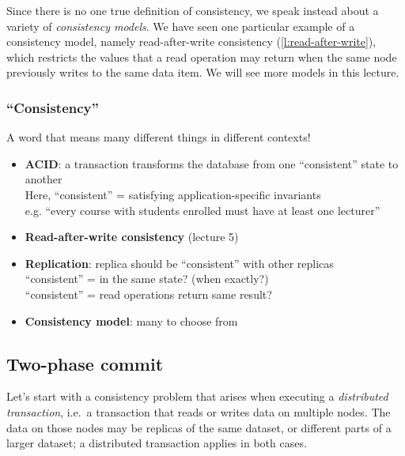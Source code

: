 Since there is no one true definition of consistency, we speak instead about a variety of \emph{consistency models}.
We have seen one particular example of a consistency model, namely read-after-write consistency (\autoref{l:read-after-write}), which restricts the values that a read operation may return when the same node previously writes to the same data item.
We will see more models in this lecture.

\begin{frame}
    \label{s:consistency}
    \frametitle{``Consistency''}
    A word that means many different things in different contexts!\pause
    \begin{itemize}
        \item \textbf{ACID}: a transaction transforms the database from one ``consistent'' state to another\\[0.5em]\pause
            Here, ``consistent'' = satisfying application-specific invariants\\[0.5em]
            e.g. ``every course with students enrolled must have at least one lecturer''\\[0.5em]\pause
        \item \textbf{Read-after-write consistency} (lecture 5)\\[0.5em]\pause
        \item \textbf{Replication}: replica should be ``consistent'' with other replicas\\[0.5em]\pause
            ``consistent'' = in the same state? (when exactly?)\\[0.5em]
            ``consistent'' = read operations return same result?\\[0.5em]
        \item \textbf{Consistency model}: many to choose from
    \end{itemize}
\end{frame}
\label{l:consistency}

\subsection{Two-phase commit}

Let's start with a consistency problem that arises when executing a \emph{distributed transaction}, i.e.\ a transaction that reads or writes data on multiple nodes.
The data on those nodes may be replicas of the same dataset, or different parts of a larger dataset; a distributed transaction applies in both cases.

